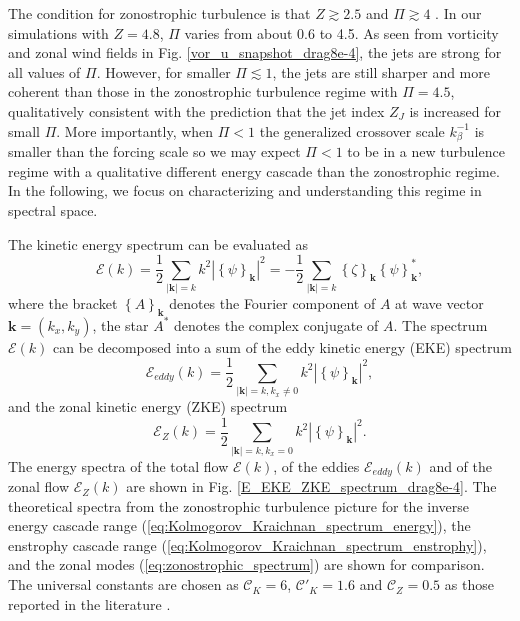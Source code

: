 \documentclass{jfm}
\begin{document}
The condition for zonostrophic turbulence is that $Z\apprge2.5$ and $\Pi\apprge4$
\citep{Sukoriansky2007,Galperin2010}. In our simulations with $Z=4.8$,
$\Pi$ varies from about 0.6 to 4.5. As seen from vorticity and zonal
wind fields in Fig. \ref{vor_u_snapshot_drag8e-4}, the jets are
strong for all values of $\Pi$. However, for smaller $\Pi\apprle 1$,
the jets are still sharper and more coherent than those in the zonostrophic turbulence
regime with $\Pi=4.5$, qualitatively consistent with the prediction
that the jet index $Z_{J}$ is increased for small $\Pi$. 
More importantly, when $\Pi<1$ the generalized crossover
scale $k_{\beta}^{-1}$ is smaller than the forcing scale so we may expect
$\Pi<1$ to be in a new turbulence regime with a qualitative different
energy cascade than the zonostrophic regime. In the following, we
focus on characterizing and understanding this regime in spectral space.

The kinetic energy spectrum can be evaluated as
\begin{equation}
\mathcal{E}(k)=\frac{1}{2}\underset{|\mathbf{k}|=k}{\sum}k^{2}|\left\{ \psi\right\} _{\mathbf{k}}|^{2}=-\frac{1}{2}\underset{|\mathbf{k}|=k}{\sum}\left\{ \zeta\right\} _{\mathbf{k}}\left\{ \psi\right\} _{\mathbf{k}}^{*},\label{eq:energy_spectrum_psi_zeta}
\end{equation}
where the bracket $\left\{ A\right\} _{\mathbf{k}}$ denotes the Fourier
component of $A$ at wave vector $\mathbf{k}=(k_{x},k_{y})$, the
star $A^{*}$ denotes the complex conjugate of $A$. The spectrum $\mathcal{E}(k)$
can be decomposed into a sum of the eddy kinetic energy (EKE) spectrum
\begin{equation}
\mathcal{E}_{eddy}(k)=\frac{1}{2}\underset{|\mathbf{k}|=k,k_{x}\neq0}{\sum}k^{2}|\left\{ \psi\right\} _{\mathbf{k}}|^{2},\label{eq:EKE_spec_psi}
\end{equation}
and the zonal kinetic energy (ZKE) spectrum
\begin{equation}
\mathcal{E}_{Z}(k)=\frac{1}{2}\underset{|\mathbf{k}|=k,k_{x}=0}{\sum}k^{2}|\left\{ \psi\right\} _{\mathbf{k}}|^{2}.\label{eq:ZKE_spec_psi}
\end{equation}
The energy spectra of the total flow $\mathcal{E}(k)$, of the eddies
$\mathcal{E}_{eddy}(k)$ and of the zonal flow $\mathcal{E}_{Z}(k)$
are shown in Fig. \ref{E_EKE_ZKE_spectrum_drag8e-4}. The theoretical
spectra from the zonostrophic turbulence picture for the inverse energy 
cascade range (\ref{eq:Kolmogorov_Kraichnan_spectrum_energy}),
the enstrophy cascade range (\ref{eq:Kolmogorov_Kraichnan_spectrum_enstrophy}),
and the zonal modes (\ref{eq:zonostrophic_spectrum}) 
are shown for comparison. The universal constants are chosen as
$\mathcal{C}_{K}=6$, $\mathcal{C'}_{K}=1.6$ and $\mathcal{C}_{Z}=0.5$
as those reported in the literature \citep{Boffetta2012,Galperin2010}.
\end{document}
